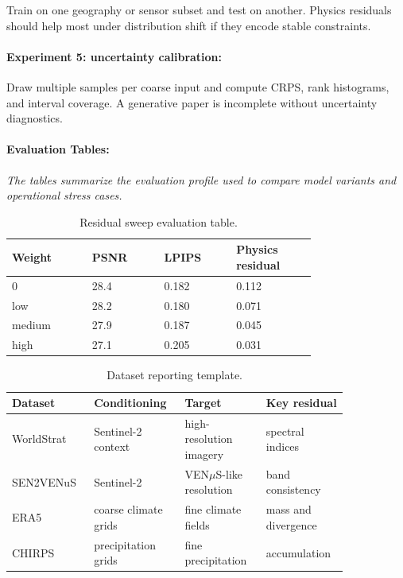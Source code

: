 \documentclass{article}
\begin{document}
Train on one geography or sensor subset and test on another. Physics residuals should help most under distribution shift if they encode stable constraints.

\paragraph{Experiment 5: uncertainty calibration:}

Draw multiple samples per coarse input and compute CRPS, rank histograms, and interval coverage. A generative paper is incomplete without uncertainty diagnostics.

\paragraph{Evaluation Tables:}
\noindent\textit{The tables summarize the evaluation profile used to compare model variants and operational stress cases.}

\begin{table}[t]
\centering
\caption{Residual sweep evaluation table.}
\begin{tabular}{@{}p{0.20\linewidth}p{0.18\linewidth}p{0.18\linewidth}p{0.20\linewidth}@{}}
\toprule
\textbf{Weight} & \textbf{PSNR} & \textbf{LPIPS} & \textbf{Physics residual}\\
\midrule
0 & 28.4 & 0.182 & 0.112\\
low & 28.2 & 0.180 & 0.071\\
medium & 27.9 & 0.187 & 0.045\\
high & 27.1 & 0.205 & 0.031\\
\bottomrule
\end{tabular}
\end{table}

\begin{table}[t]
\centering
\caption{Dataset reporting template.}
\begin{tabular}{@{}p{0.20\linewidth}p{0.22\linewidth}p{0.22\linewidth}p{0.20\linewidth}@{}}
\toprule
\textbf{Dataset} & \textbf{Conditioning} & \textbf{Target} & \textbf{Key residual}\\
\midrule
WorldStrat & Sentinel-2 context & high-resolution imagery & spectral indices\\
SEN2VENuS & Sentinel-2 & VEN$\mu$S-like resolution & band consistency\\
ERA5 & coarse climate grids & fine climate fields & mass and divergence\\
CHIRPS & precipitation grids & fine precipitation & accumulation\\
\bottomrule
\end{tabular}
\end{table}
\end{document}

